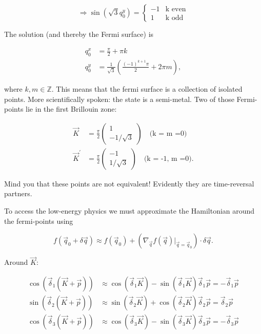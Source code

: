 \documentclass[../../../main.tex]{subfiles}
\begin{document}
\begin{equation}
	\Rightarrow \sin(\sqrt{3}q_0^y) = 
	\begin{cases}
		-1 & \text{k even} \\
		1 & \text{k odd}
	\end{cases}
\end{equation}


The solution (and thereby the Fermi surface) is 

\begin{align}
	q_0^x &= \frac{\pi}{2} + \pi k \\
	q_0^y &= \frac{1}{\sqrt{3}}\left(\frac{(-1)^{k+1}\pi}{2} + 2 \pi m\right),
\end{align}

where $k, m \in \mathbb{Z}$. This means that the fermi surface is a collection of isolated points. More scientifically spoken: the state is a semi-metal. Two of those Fermi-points lie in the first Brillouin zone:


\begin{align}
	\vec{K} &= \frac{\pi}{2} 
	\begin{pmatrix}
		1 \\
		-1/\sqrt{3}
	\end{pmatrix} \quad \text{(k = m =0)} \\
	\vec{K}^\prime &= \frac{\pi}{2}
	\begin{pmatrix}
		-1 \\
		1/\sqrt{3}
	\end{pmatrix} \quad \text{(k = -1, m =0)}.
\end{align}

Mind you that these points are not equivalent! Evidently they are time-reversal partners. 



To access the low-energy physics we must approximate the Hamiltonian around the fermi-points using

\begin{equation}
	f\left(\vec{q}_0 + \delta \vec{q}\right) \approx f(\vec{q}_0) + \left(\nabla_{\vec{q}}f(\vec{q})\rvert_{\vec{q}=\vec{q}_0}\right)\cdot\delta\vec{q}.
\end{equation}

Around $\vec{K}$:

\begin{align}
	\cos(\vec{\delta}_1(\vec{K} + \vec{p})) &\approx \cos(\vec{\delta}_1\vec{K}) - \sin(\vec{\delta}_1\vec{K})\vec{\delta}_1\vec{p} = - \vec{\delta}_1\vec{p}\\
	\sin(\vec{\delta}_2(\vec{K} + \vec{p})) &\approx \sin(\vec{\delta}_2\vec{K}) + \cos(\vec{\delta}_2\vec{K}) \vec{\delta}_2\vec{p} = \vec{\delta}_2\vec{p} \\
	\cos(\vec{\delta}_3(\vec{K} + \vec{p})) &\approx \cos(\vec{\delta}_3\vec{K}) - \sin(\vec{\delta}_3\vec{K}) \vec{\delta}_3\vec{p} = - \vec{\delta}_3\vec{p}
\end{align}
\end{document}
